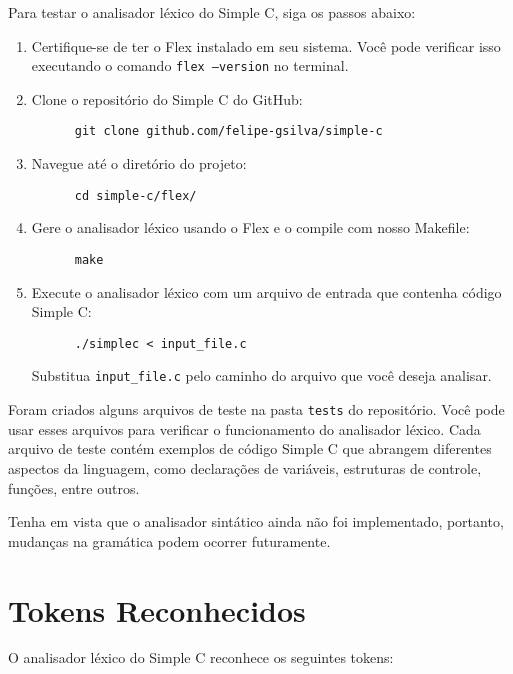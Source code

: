 \documentclass[12pt,a4paper]{article}
\begin{document}
Para testar o analisador léxico do Simple C, siga os passos abaixo:
\begin{enumerate}
  \item Certifique-se de ter o Flex instalado em seu sistema. Você pode verificar isso executando o comando \texttt{flex --version} no terminal.
  \item Clone o repositório do Simple C do GitHub:
    \begin{verbatim}
      git clone github.com/felipe-gsilva/simple-c
    \end{verbatim}
  \item Navegue até o diretório do projeto:
    \begin{verbatim}
      cd simple-c/flex/
    \end{verbatim}
  \item Gere o analisador léxico usando o Flex e o compile com nosso Makefile:
    \begin{verbatim}
      make
    \end{verbatim}
  \item Execute o analisador léxico com um arquivo de entrada que contenha código Simple C:
    \begin{verbatim}
      ./simplec < input_file.c
    \end{verbatim}
    Substitua \texttt{input\_file.c} pelo caminho do arquivo que você deseja analisar.

\end{enumerate}

Foram criados alguns arquivos de teste na pasta \texttt{tests} do repositório. Você pode usar esses arquivos para verificar o funcionamento do analisador léxico. Cada arquivo de teste contém exemplos de código Simple C que abrangem diferentes aspectos da linguagem, como declarações de variáveis, estruturas de controle, funções, entre outros. 

Tenha em vista que o analisador sintático ainda não foi implementado, portanto, mudanças na gramática podem ocorrer futuramente.

\newpage
\section{Tokens Reconhecidos}
O analisador léxico do Simple C reconhece os seguintes tokens:
\end{document}
